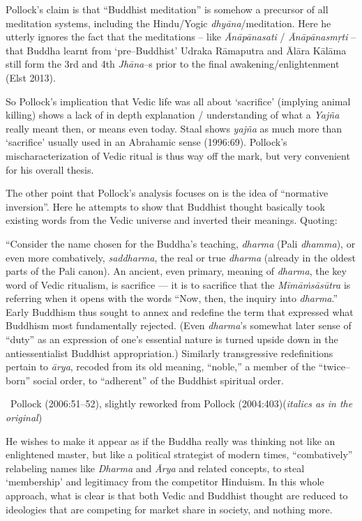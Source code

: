 Pollock’s claim is that “Buddhist meditation” is somehow a precursor of all meditation systems, including the Hindu/Yogic \textit{dhyāna}/meditation. Here he utterly ignores the fact that the meditations – like \textit{Ānāpānasati} / \textit{Ānāpānasmṛti} – that Buddha learnt from ‘pre–Buddhist’ Udraka Rāmaputra and Ālāra Kālāma still form the 3rd and 4th \textit{Jhāna}–s prior to the final awakening/enlightenment (Elst 2013).

So Pollock’s implication that Vedic life was all about ‘sacrifice’ (implying animal killing) shows a lack of in depth explanation / understanding of what a \textit{Yajña} really meant then, or means even today. Staal shows \textit{yajña} as much more than ‘sacrifice’ usually used in an Abrahamic sense (1996:69). Pollock’s mischaracterization of Vedic ritual is thus way off the mark, but very convenient for his overall thesis.

The other point that Pollock’s analysis focuses on is the idea of “normative inversion”. Here he attempts to show that Buddhist thought basically took existing words from the Vedic universe and inverted their meanings. Quoting:

\begin{myquote}
“Consider the name chosen for the Buddha’s teaching, \textit{dharma} (Pali \textit{dhamma}), or even more combatively, \textit{saddharma}, the real or true \textit{dharma} (already in the oldest parts of the Pali canon). An ancient, even primary, meaning of \textit{dharma}, the key word of Vedic ritualism, is sacriﬁce — it is to sacriﬁce that the \textit{Mīmāṁsāsūtra} is referring when it opens with the words “Now, then, the inquiry into \textit{dharma}.” Early Buddhism thus sought to annex and redeﬁne the term that expressed what Buddhism most fundamentally rejected. (Even \textit{dharma}’s somewhat later sense of “duty” as an expression of one’s essential nature is turned upside down in the antiessentialist Buddhist appropriation.) Similarly transgressive redeﬁnitions pertain to \textit{ārya}, recoded from its old meaning, “noble,” a member of the “twice–born” social order, to “adherent” of the Buddhist spiritual order. 

~\hfill Pollock (2006:51–52), slightly reworked from Pollock (2004:403)(\textit{italics as in the original})
\end{myquote}

He wishes to make it appear as if the Buddha really was thinking not like an enlightened master, but like a political strategist of modern times, “combatively” relabeling names like \textit{Dharma} and \textit{Ārya} and related concepts, to steal ‘membership’ and legitimacy from the competitor Hinduism. In this whole approach, what is clear is that both Vedic and Buddhist thought are reduced to ideologies that are competing for market share in society, and nothing more.

